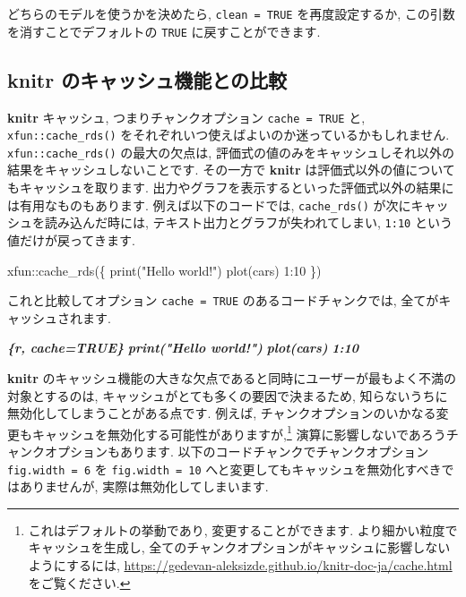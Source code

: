 \documentclass[
  11pt,
  lualatex,
  ja=standard]{bxjsreport}
\newenvironment{Shaded}{\begin{snugshade}}{\end{snugshade}}
\newcommand{\DecValTok}[1]{\textcolor[rgb]{0.00,0.00,0.81}{#1}}
\newcommand{\FunctionTok}[1]{\textcolor[rgb]{0.00,0.00,0.00}{#1}}
\newcommand{\InformationTok}[1]{\textcolor[rgb]{0.56,0.35,0.01}{\textbf{\textit{#1}}}}
\newcommand{\NormalTok}[1]{#1}
\newcommand{\SpecialCharTok}[1]{\textcolor[rgb]{0.00,0.00,0.00}{#1}}
\newcommand{\StringTok}[1]{\textcolor[rgb]{0.31,0.60,0.02}{#1}}
\begin{document}
どちらのモデルを使うかを決めたら, \texttt{clean = TRUE} を再度設定するか, この引数を消すことでデフォルトの \texttt{TRUE} に戻すことができます.

\hypertarget{knitr-ux306eux30adux30e3ux30c3ux30b7ux30e5ux6a5fux80fdux3068ux306eux6bd4ux8f03}{%
\subsection{\texorpdfstring{\textbf{knitr} のキャッシュ機能との比較}{knitr のキャッシュ機能との比較}}\label{knitr-ux306eux30adux30e3ux30c3ux30b7ux30e5ux6a5fux80fdux3068ux306eux6bd4ux8f03}}

\textbf{knitr} キャッシュ, つまりチャンクオプション \texttt{cache = TRUE} と, \texttt{xfun::cache\_rds()} をそれぞれいつ使えばよいのか迷っているかもしれません. \texttt{xfun::cache\_rds()} の最大の欠点は, 評価式の値のみをキャッシュしそれ以外の結果をキャッシュしないことです. その一方で \textbf{knitr} は評価式以外の値についてもキャッシュを取ります. 出力やグラフを表示するといった評価式以外の結果には有用なものもあります. 例えば以下のコードでは, \texttt{cache\_rds()} が次にキャッシュを読み込んだ時には, テキスト出力とグラフが失われてしまい, \texttt{1:10} という値だけが戻ってきます.

\begin{Shaded}
\begin{Highlighting}[numbers=left,,]
\NormalTok{xfun}\SpecialCharTok{::}\FunctionTok{cache\_rds}\NormalTok{(\{}
  \FunctionTok{print}\NormalTok{(}\StringTok{"Hello world!"}\NormalTok{)}
  \FunctionTok{plot}\NormalTok{(cars)}
  \DecValTok{1}\SpecialCharTok{:}\DecValTok{10}
\NormalTok{\})}
\end{Highlighting}
\end{Shaded}

これと比較してオプション \texttt{cache = TRUE} のあるコードチャンクでは, 全てがキャッシュされます.

\begin{Shaded}
\begin{Highlighting}[]
\InformationTok{\textasciigrave{}\textasciigrave{}\textasciigrave{}\{r, cache=TRUE\}}
\InformationTok{print("Hello world!")}
\InformationTok{plot(cars)}
\InformationTok{1:10}
\InformationTok{\textasciigrave{}\textasciigrave{}\textasciigrave{}}
\end{Highlighting}
\end{Shaded}

\textbf{knitr} のキャッシュ機能の大きな欠点であると同時にユーザーが最もよく不満の対象とするのは, キャッシュがとても多くの要因で決まるため, 知らないうちに無効化してしまうことがある点です. 例えば, チャンクオプションのいかなる変更もキャッシュを無効化する可能性がありますが,\footnote{これはデフォルトの挙動であり, 変更することができます. より細かい粒度でキャッシュを生成し, 全てのチャンクオプションがキャッシュに影響しないようにするには, \url{https://gedevan-aleksizde.github.io/knitr-doc-ja/cache.html} をご覧ください.} 演算に影響しないであろうチャンクオプションもあります. 以下のコードチャンクでチャンクオプション \texttt{fig.width = 6} を \texttt{fig.width = 10} へと変更してもキャッシュを無効化すべきではありませんが, 実際は無効化してしまいます.
\end{document}
